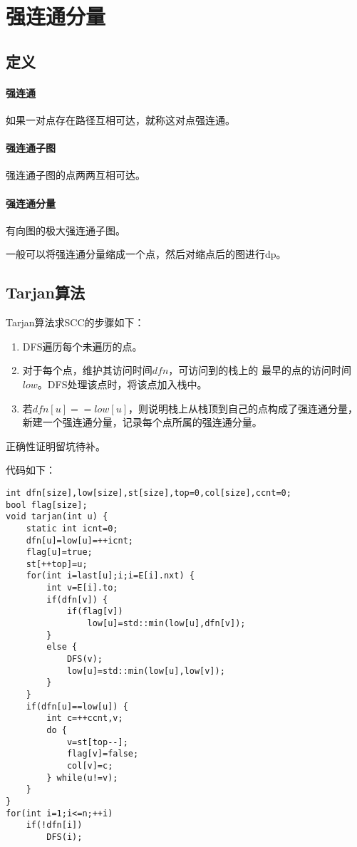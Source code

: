 \section{强连通分量}
\subsection{定义}
\paragraph{强连通} 如果一对点存在路径互相可达，就称这对点强连通。
\paragraph{强连通子图} 强连通子图的点两两互相可达。
\paragraph{强连通分量} 有向图的极大强连通子图。

一般可以将强连通分量缩成一个点，然后对缩点后的图进行dp。
\subsection{Tarjan算法}
Tarjan算法求SCC的步骤如下：

\begin{enumerate}
	\item DFS遍历每个未遍历的点。
	\item 对于每个点，维护其访问时间$dfn$，可访问到的栈上的
	      最早的点的访问时间$low$。DFS处理该点时，将该点加入栈中。
	\item 若$dfn[u]==low[u]$，则说明栈上从栈顶到自己的点构成了强连通分量，
	      新建一个强连通分量，记录每个点所属的强连通分量。
\end{enumerate}

正确性证明留坑待补。

代码如下：
\begin{lstlisting}
int dfn[size],low[size],st[size],top=0,col[size],ccnt=0;
bool flag[size];
void tarjan(int u) {
    static int icnt=0;
    dfn[u]=low[u]=++icnt;
    flag[u]=true;
    st[++top]=u;
    for(int i=last[u];i;i=E[i].nxt) {
        int v=E[i].to;
        if(dfn[v]) {
            if(flag[v])
                low[u]=std::min(low[u],dfn[v]);
        }
        else {
            DFS(v);
            low[u]=std::min(low[u],low[v]);
        }
    }
    if(dfn[u]==low[u]) {
        int c=++ccnt,v;
        do {
            v=st[top--];
            flag[v]=false;
            col[v]=c;
        } while(u!=v);
    }
}
for(int i=1;i<=n;++i)
    if(!dfn[i])
        DFS(i);
\end{lstlisting}
